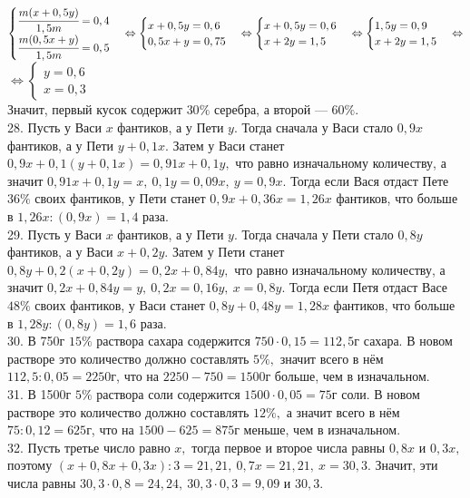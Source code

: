 $\begin{cases}
\cfrac{m(x+0,5y)}{1,5m}=0,4\\
\cfrac{m(0,5x+y)}{1,5m}=0,5
\end{cases}
\Leftrightarrow
\begin{cases}
x+0,5y=0,6\\
0,5x+y=0,75
\end{cases}
\Leftrightarrow
\begin{cases}
x+0,5y=0,6\\
x+2y=1,5
\end{cases}
\Leftrightarrow
\begin{cases}
1,5y=0,9\\
x+2y=1,5
\end{cases}
\Leftrightarrow$\\$\Leftrightarrow
\begin{cases}
y=0,6\\
x=0,3
\end{cases}
$\\
Значит, первый кусок содержит $30\%$ серебра, а второй --- $60\%.$\\
28. Пусть у Васи $x$ фантиков, а у Пети $y.$ Тогда сначала у Васи стало $0,9x$ фантиков, а у Пети $y+0,1x.$ Затем у Васи станет $0,9x+0,1(y+0,1x)=0,91x+0,1y,$ что равно изначальному количеству, а значит $0,91x+0,1y=x,\ 0,1y=0,09x,\ y=0,9x.$ Тогда если Вася отдаст Пете $36\%$ своих фантиков, у Пети станет $0,9x+0,36x=1,26x$ фантиков, что больше в $1,26x:(0,9x)=1,4$ раза.\\
29. Пусть у Васи $x$ фантиков, а у Пети $y.$ Тогда сначала у Пети стало $0,8y$ фантиков, а у Васи $x+0,2y.$ Затем у Пети станет $0,8y+0,2(x+0,2y)=0,2x+0,84y,$ что равно изначальному количеству, а значит $0,2x+0,84y=y,\ 0,2x=0,16y,\ x=0,8y.$ Тогда если Петя отдаст Васе $48\%$ своих фантиков, у Васи станет $0,8y+0,48y=1,28x$ фантиков, что больше в $1,28y:(0,8y)=1,6$ раза.\\
30. В 750г $15\%$ раствора сахара содержится $750\cdot0,15=112,5$г сахара. В новом растворе это количество должно составлять $5\%,$ значит всего в нём $112,5:0,05=2250$г, что на $2250-750=1500$г больше, чем в изначальном.\\
31. В 1500г $5\%$ раствора соли содержится $1500\cdot0,05=75$г соли. В новом растворе это количество должно составлять $12\%,$ а значит всего в нём $75:0,12=625$г, что на $1500-625=875$г меньше, чем в изначальном.\\
32. Пусть третье число равно $x,$ тогда первое и второе числа равны $0,8x$ и $0,3x,$ поэтому $(x+0,8x+0,3x):3=21,21,\ 0,7x=21,21,\ x=30,3.$ Значит, эти числа равны $30,3\cdot0,8=24,24,\ 30,3\cdot0,3=9,09$ и $30,3.$\\

